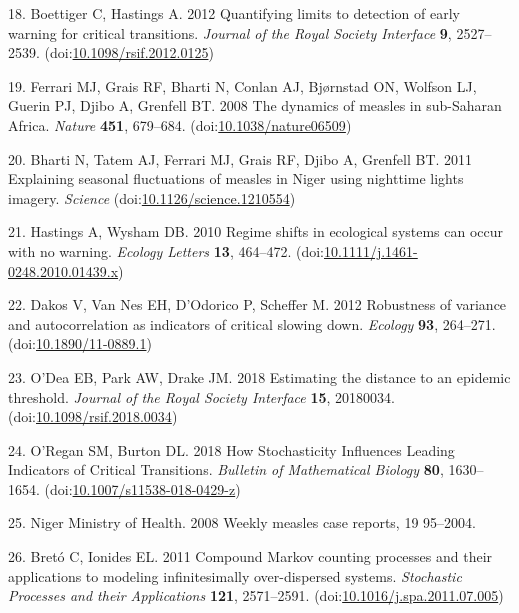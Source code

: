 \documentclass[3p]{elsarticle} %
\begin{document}
\leavevmode\hypertarget{ref-Boettiger2012}{}%
18. Boettiger C, Hastings A. 2012 Quantifying limits to detection of
early warning for critical transitions. \emph{Journal of the Royal
Society Interface} \textbf{9}, 2527--2539.
(doi:\href{https://doi.org/10.1098/rsif.2012.0125}{10.1098/rsif.2012.0125})

\leavevmode\hypertarget{ref-Ferrari2008}{}%
19. Ferrari MJ, Grais RF, Bharti N, Conlan AJ, Bjørnstad ON, Wolfson LJ,
Guerin PJ, Djibo A, Grenfell BT. 2008 The dynamics of measles in
sub-Saharan Africa. \emph{Nature} \textbf{451}, 679--684.
(doi:\href{https://doi.org/10.1038/nature06509}{10.1038/nature06509})

\leavevmode\hypertarget{ref-Bharti2011}{}%
20. Bharti N, Tatem AJ, Ferrari MJ, Grais RF, Djibo A, Grenfell BT. 2011
Explaining seasonal fluctuations of measles in Niger using nighttime
lights imagery. \emph{Science}
(doi:\href{https://doi.org/10.1126/science.1210554}{10.1126/science.1210554})

\leavevmode\hypertarget{ref-Hastings2010}{}%
21. Hastings A, Wysham DB. 2010 Regime shifts in ecological systems can
occur with no warning. \emph{Ecology Letters} \textbf{13}, 464--472.
(doi:\href{https://doi.org/10.1111/j.1461-0248.2010.01439.x}{10.1111/j.1461-0248.2010.01439.x})

\leavevmode\hypertarget{ref-Dakos2012a}{}%
22. Dakos V, Van Nes EH, D'Odorico P, Scheffer M. 2012 Robustness of
variance and autocorrelation as indicators of critical slowing down.
\emph{Ecology} \textbf{93}, 264--271.
(doi:\href{https://doi.org/10.1890/11-0889.1}{10.1890/11-0889.1})

\leavevmode\hypertarget{ref-ODea2018a}{}%
23. O'Dea EB, Park AW, Drake JM. 2018 Estimating the distance to an
epidemic threshold. \emph{Journal of the Royal Society Interface}
\textbf{15}, 20180034.
(doi:\href{https://doi.org/10.1098/rsif.2018.0034}{10.1098/rsif.2018.0034})

\leavevmode\hypertarget{ref-ORegan2018}{}%
24. O'Regan SM, Burton DL. 2018 How Stochasticity Influences Leading
Indicators of Critical Transitions. \emph{Bulletin of Mathematical
Biology} \textbf{80}, 1630--1654.
(doi:\href{https://doi.org/10.1007/s11538-018-0429-z}{10.1007/s11538-018-0429-z})

\leavevmode\hypertarget{ref-NigerMinistryofHealth2008}{}%
25. Niger Ministry of Health. 2008 Weekly measles case reports, 19
95--2004.

\leavevmode\hypertarget{ref-Breto2011}{}%
26. Bretó C, Ionides EL. 2011 Compound Markov counting processes and
their applications to modeling infinitesimally over-dispersed systems.
\emph{Stochastic Processes and their Applications} \textbf{121},
2571--2591.
(doi:\href{https://doi.org/10.1016/j.spa.2011.07.005}{10.1016/j.spa.2011.07.005})
\end{document}
